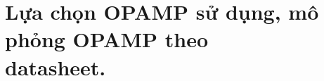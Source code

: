 \section[Lựa chọn OPAMP sử dụng, mô phỏng OPAMP theo datasheet.]{Lựa chọn OPAMP sử dụng, mô phỏng OPAMP theo\\ datasheet.}




